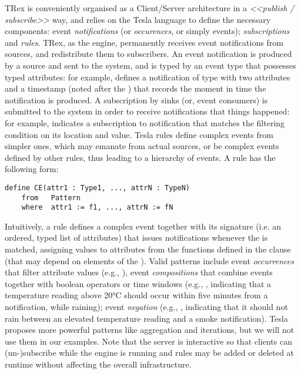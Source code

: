 TRex is conveniently organised as a Client/Server architecture in a \textit{<<publish / subscribe>>} way, and relies on the Tesla language to define the necessary components: event \emph{notifications} (or \emph{occurences}, or simply events); \emph{subscriptions} and \emph{rules}. TRex, as the \CEP engine, permanently receives event notifications from sources, and redistribute them to subscribers. 
An event notification is produced by a source and sent to the \CEP system, and is typed by an event type that possesses typed attributes: for example,  defines a notification of type  with two attributes and a timestamp (noted after the ) that records the moment in time the notification is produced. A subscription by sinks (or, event consumers) is submitted to the \CEP system in order to receive notifications that things happened: for example,  indicates a subscription to  notification that matches the filtering condition on its location and value. Tesla rules define complex events from simpler ones, which may emanate from actual sources, or be complex events defined by other rules, thus leading to a hierarchy of events. A rule has the following form:
\begin{lstlisting}[language=tesla, numbers=none]
	define CE(attr1 : Type1, ..., attrN : TypeN)
	from   Pattern
	where  attr1 := f1, ..., attrN := fN
\end{lstlisting}
Intuitively, a rule defines a complex event  together with its signature (i.e. an ordered, typed list of attributes) that issues  notifications whenever the  is matched, assigning values to  attributes from the functions defined in the  clause (that may depend on elements of the ). Valid patterns include event \emph{occurrences} that filter attribute values (e.g., ), event \emph{compositions} that combine events together with boolean operators or time windows (e.g., , indicating that a temperature reading above 20°C should occur within five minutes from a  notification, while raining); event \emph{negation} (e.g., , indicating that it should not rain between an elevated temperature reading and a smoke notification). Tesla proposes more powerful patterns like aggregation and iterations, but we will not use them in our examples.
Note that the server is interactive so that clients can (un-)subscribe while the engine is running and rules may be added or deleted at runtime without affecting the overall infrastructure. 

